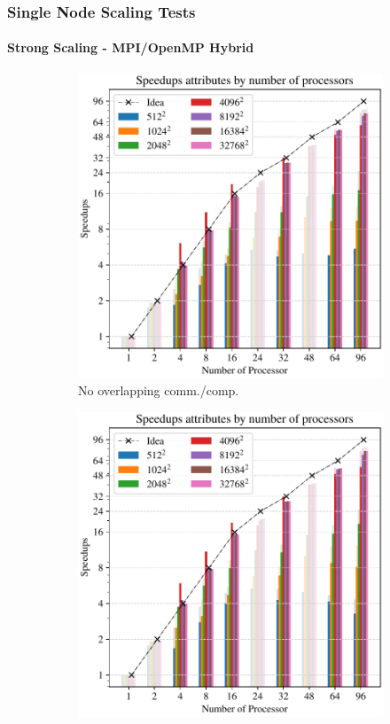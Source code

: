 \begin{frame}
  \frametitle{Single Node Scaling Tests}
  \framesubtitle{Strong Scaling - MPI/OpenMP Hybrid}
  \begin{figure}
    \centering
    \begin{subfigure}{0.41\textwidth}
      \centering
      \includegraphics[width=\textwidth]{figure/FIG_Benchmark_hybrid_0.pdf}
      \caption{No overlapping comm./comp.}
      \label{FIG:Benchmark:Hybrid_0}
    \end{subfigure}
    \begin{subfigure}{0.41\textwidth}
      \centering
      \includegraphics[width=\textwidth]{figure/FIG_Benchmark_hybrid_1.pdf}

\end{subfigure}
\end{figure}
\end{frame}
